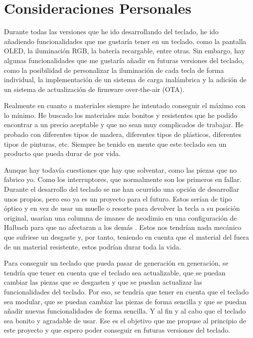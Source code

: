 \section{Consideraciones Personales}
Durante todas las versiones que he ido desarrollando del teclado, he ido añadiendo funcionalidades que me gustaría tener en un teclado, como la pantalla OLED, la iluminación RGB, la batería recargable, entre otras. Sin embargo, hay algunas funcionalidades que me gustaría añadir en futuras versiones del teclado, como la posibilidad de personalizar la iluminación de cada tecla de forma individual, la implementación de un sistema de carga inalámbrica y la adición de un sistema de actualización de firmware over-the-air (OTA).

Realmente en cuanto a materiales siempre he intentado conseguir el máximo con lo mínimo. He buscado los materiales más bonitos y resistentes que he podido encontrar a un precio aceptable y que no sean muy complicados de trabajar. He probado con diferentes tipos de madera, diferentes tipos de plásticos, diferentes tipos de pinturas, etc. Siempre he tenido en mente que este teclado sea un producto que pueda durar de por vida.

Aunque hay todavía cuestiones que hay que solventar, como las piezas que no fabrico yo. Como los interruptores, que normalmente son los primeros en fallar. Durante el desarrollo del teclado se me han ocurrido una opción de desarrollar unos  propios, pero eso ya es un proyecto para el futuro. Estos  serían de tipo óptico y en vez de usar un muelle o resorte para devolver la tecla a su posición original, usarían una columna de imanes de neodimio en una configuración de Halbach para que no afectaran a los demás . Estos nos tendrían nada mecánico que sufriese un desgaste y, por tanto, teniendo en cuenta que el material del  fuera de un material resistente, estos  podrían durar toda la vida.

Para conseguir un teclado que pueda pasar de generación en generación, se tendría que tener en cuenta que el teclado sea actualizable, que se puedan cambiar las piezas que se desgasten y que se puedan actualizar las funcionalidades del teclado. Por eso, se tendría que tener en cuenta que el teclado sea modular, que se puedan cambiar las piezas de forma sencilla y que se puedan añadir nuevas funcionalidades de forma sencilla. Y al fin y al cabo que el teclado sea bonito y agradable de usar. Ese es el objetivo que me propuse al principio de este proyecto y que espero poder conseguir en futuras versiones del teclado.
